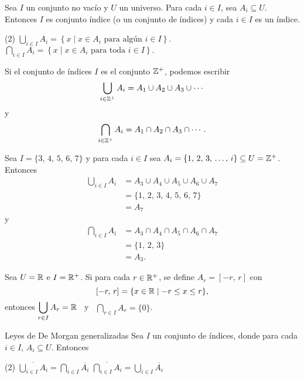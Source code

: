 \newpage

\begin{definicion}{}{}
    Sea $I$ un conjunto no vacío y $U$ un universo. Para cada $i \in I$, sea $A_i \subseteq U$. Entonces $I$ es conjunto índice (o un conjunto de índices) y cada $i \in I$ es un índice.
    \begin{tasks}(2)
        \task $\displaystyle \bigcup_{i \in I} A_i = \left\{ x \mid x \in A_i \text{ para  algún } i \in I \right\}.$
        \task $\displaystyle \bigcap_{i \in I} A_i = \left\{ x \mid x \in A_i \text{ para toda } i \in I \right\}.$
    \end{tasks}
\end{definicion}

\begin{myexample}
    Si el conjunto de índices $I$ es el conjunto $\ZZ[+]$, podemos escribir
    $$\bigcup_{i \in \ZZ[+]} A_i = A_1 \cup A_2 \cup A_3 \cup \cdots$$
    y
    $$\bigcap_{i \in \ZZ[+]} A_i = A_1 \cap A_2 \cap A_3 \cap \cdots.$$
\end{myexample}

\begin{myexample}
    Sea $I = \{ 3, \, 4, \, 5, \, 6, \, 7 \}$ y para cada $i \in I$ sea $A_i = \{ 1, \, 2, \, 3, \, \dots, \, i \} \subseteq U = \ZZ[+]$. Entonces
    \begin{align*}
        \bigcup_{i \in I} A_i & = A_3 \cup A_4 \cup A_5 \cup A_6 \cup A_7 \\
        & = \{ 1, \, 2, \, 3, \, 4, \, 5, \, 6, \, 7 \} \\
        & = A_7
    \end{align*}
    y
    \begin{align*}
        \bigcap_{i \in I} A_i & = A_3 \cap A_4 \cap A_5 \cap A_6 \cap A_7 \\
        & = \{ 1, \, 2, \, 3 \} \\
        & = A_3.
    \end{align*}
\end{myexample}

\begin{myexample}
    Sea $U = \RR$ e $I = \RR[+]$. Si para cada $r \in \RR[+]$, se define $A_r = [-r, \, r]$ con
    $$[-r, \, r] = \{ x \in \RR \mid -r \leq x \leq r \},$$
    entonces $\displaystyle \bigcup_{r \in I} A_r = \RR$ ~y~ $\displaystyle \bigcap_{r \in I} A_r = \{0\}$.
\end{myexample}

\begin{theorem}{Leyes de De Morgan generalizadas}{}
    Sea $I$ un conjunto de índices, donde para cada $i \in I$, $A_i \subseteq U$. Entonces
    \begin{tasks}(2)
        \task $\displaystyle \overline{\bigcup_{i \in I} A_i} = \bigcap_{i \in I} \overline{A_i}$
        \task $\displaystyle \overline{\bigcap_{i \in I} A_i} = \bigcup_{i \in I} \overline{A_i}$
    \end{tasks}
\end{theorem}


